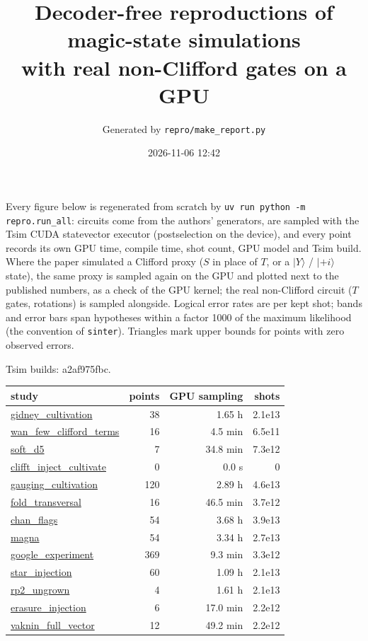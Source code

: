 \documentclass[10pt]{article}
\title{Decoder-free reproductions of magic-state simulations\\with real non-Clifford gates on a GPU}
\author{Generated by \texttt{repro/make\_report.py}}
\date{2026-11-06 12:42}
\begin{document}
\maketitle

\noindent Every figure below is regenerated from scratch by \texttt{uv run python -m repro.run\_all}:
circuits come from the authors' generators, are sampled with the Tsim CUDA statevector executor
(postselection on the device), and every point records its own GPU time, compile time, shot count,
GPU model and Tsim build. Where the paper simulated a Clifford proxy ($S$ in place of $T$, or a
$|Y\rangle$ / $|{+i}\rangle$ state), the same proxy is sampled again on the GPU and plotted next to
the published numbers, as a check of the GPU kernel; the real non-Clifford circuit ($T$ gates,
rotations) is sampled alongside. Logical error rates are per kept shot; bands and error bars span
hypotheses within a factor 1000 of the maximum likelihood (the convention of \texttt{sinter}).
Triangles mark upper bounds for points with zero observed errors.

\smallskip\noindent Tsim builds: a2af975fbc.

\begin{table}[h]\centering\small
\begin{tabular}{l r r r}
\toprule
study & points & GPU sampling & shots \\
\midrule
\hyperref[sec:gidney_cultivation]{gidney\_cultivation} & 38 & 1.65 h & 2.1e13 \\
\hyperref[sec:wan_few_clifford_terms]{wan\_few\_clifford\_terms} & 16 & 4.5 min & 6.5e11 \\
\hyperref[sec:soft_d5]{soft\_d5} & 7 & 34.8 min & 7.3e12 \\
\hyperref[sec:clifft_inject_cultivate]{clifft\_inject\_cultivate} & 0 & 0.0 s & 0 \\
\hyperref[sec:gauging_cultivation]{gauging\_cultivation} & 120 & 2.89 h & 4.6e13 \\
\hyperref[sec:fold_transversal]{fold\_transversal} & 16 & 46.5 min & 3.7e12 \\
\hyperref[sec:chan_flags]{chan\_flags} & 54 & 3.68 h & 3.9e13 \\
\hyperref[sec:magna]{magna} & 54 & 3.34 h & 2.7e13 \\
\hyperref[sec:google_experiment]{google\_experiment} & 369 & 9.3 min & 3.3e12 \\
\hyperref[sec:star_injection]{star\_injection} & 60 & 1.09 h & 2.1e13 \\
\hyperref[sec:rp2_ungrown]{rp2\_ungrown} & 4 & 1.61 h & 2.1e13 \\
\hyperref[sec:erasure_injection]{erasure\_injection} & 6 & 17.0 min & 2.2e12 \\
\hyperref[sec:vaknin_full_vector]{vaknin\_full\_vector} & 12 & 49.2 min & 2.2e12 \\
\bottomrule
\end{tabular}
\end{table}
\tableofcontents
\clearpage
\end{document}

